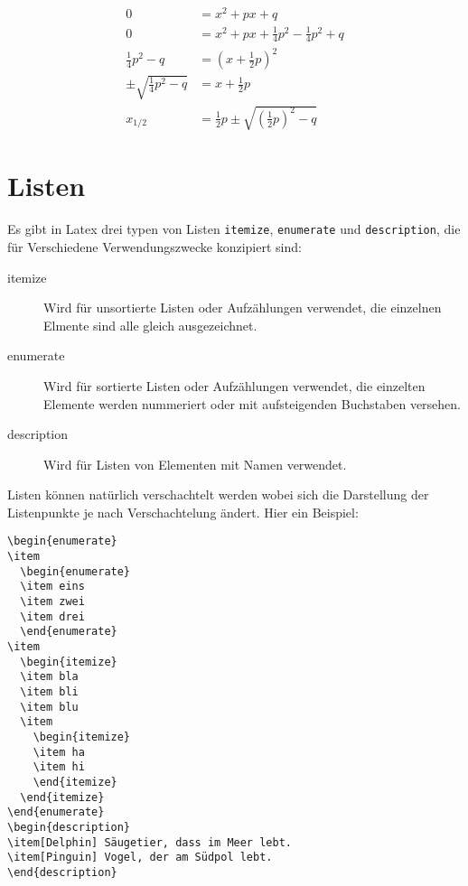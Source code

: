 \begin{align}
  0                  &= x^2 + px + q \\
  0                  &= x^2 + px + \frac{1}{4}p^2 - \frac{1}{4}p^2 + q \\
  \frac{1}{4}p^2 - q &= \left(x + \frac{1}{2}p \right)^2 \\
  \pm \sqrt{ \frac{1}{4}p^2 - q} &= x + \frac{1}{2}p \\
  x_{1/2}            &= \frac{1}{2}p \pm \sqrt{\left(\frac{1}{2}p\right)^2 - q}  
\end{align}

\section{Listen}
Es gibt in Latex drei typen von Listen \verb+itemize+, \verb+enumerate+ und \verb+description+, die für
Verschiedene Verwendungszwecke konzipiert sind:
\begin{description}
\item[itemize] Wird für unsortierte Listen oder Aufzählungen verwendet, die einzelnen Elmente sind alle
  gleich ausgezeichnet.
\item[enumerate] Wird für sortierte Listen oder Aufzählungen verwendet, die einzelten Elemente werden
  nummeriert oder mit aufsteigenden Buchstaben versehen.
\item[description] Wird für Listen von Elementen mit Namen verwendet. 
\end{description}
Listen können natürlich verschachtelt werden wobei sich die Darstellung der Listenpunkte je nach Verschachtelung
ändert. Hier ein Beispiel:
\begin{verbatim}
\begin{enumerate}
\item
  \begin{enumerate}
  \item eins
  \item zwei
  \item drei
  \end{enumerate}
\item
  \begin{itemize}
  \item bla
  \item bli
  \item blu
  \item
    \begin{itemize}
    \item ha
    \item hi
    \end{itemize}
  \end{itemize}
\end{enumerate}
\begin{description}
\item[Delphin] Säugetier, dass im Meer lebt.
\item[Pinguin] Vogel, der am Südpol lebt. 
\end{description}
\end{verbatim}
